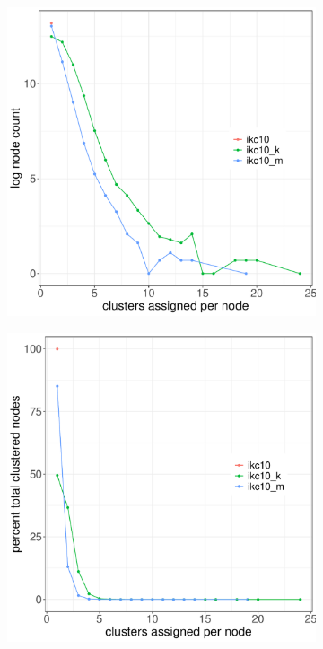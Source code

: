 \documentclass[12pt, oneside]{article}   	%
\begin{document}
\begin{figure}[H]
\centering
\begin{subfigure}[t]{0.48\textwidth}
\centering
\includegraphics[width=\linewidth]{bl_fig2a.pdf} 
\end{subfigure}
\hfill
\begin{subfigure}[t]{0.48\textwidth}
\centering
\includegraphics[width=\linewidth]{bl_fig2b.pdf} 

\end{subfigure}
\end{figure}
\end{document}
